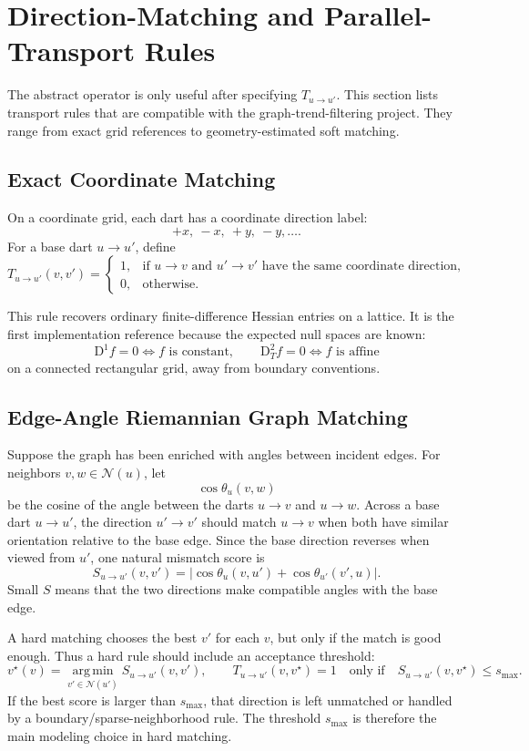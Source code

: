 \documentclass[11pt]{article}
\newcommand{\N}{\mathcal N}
\newcommand{\D}{\mathrm D}
\newcommand{\argmin}{\operatorname*{arg\,min}}
\begin{document}
\section{Direction-Matching and Parallel-Transport Rules}

The abstract operator is only useful after specifying \(T_{u\to u'}\).  This
section lists transport rules that are compatible with the graph-trend-filtering
project.  They range from exact grid references to geometry-estimated soft
matching.

\subsection{Exact Coordinate Matching}

On a coordinate grid, each dart has a coordinate direction label:
\[
  +x,\ -x,\ +y,\ -y,\ldots.
\]
For a base dart \(u\to u'\), define
\[
  T_{u\to u'}(v,v')=
  \begin{cases}
    1, & \text{if } u\to v \text{ and } u'\to v'
         \text{ have the same coordinate direction},\\
    0, & \text{otherwise}.
  \end{cases}
\]

This rule recovers ordinary finite-difference Hessian entries on a lattice.
It is the first implementation reference because the expected null spaces are
known:
\[
  \D^1 f=0 \Longleftrightarrow f \text{ is constant},
  \qquad
  \D_T^2 f=0 \Longleftrightarrow f \text{ is affine}
\]
on a connected rectangular grid, away from boundary conventions.

\subsection{Edge-Angle Riemannian Graph Matching}

Suppose the graph has been enriched with angles between incident edges.  For
neighbors \(v,w\in\N(u)\), let
\[
  \cos\theta_u(v,w)
\]
be the cosine of the angle between the darts \(u\to v\) and \(u\to w\).
Across a base dart \(u\to u'\), the direction \(u'\to v'\) should match
\(u\to v\) when both have similar orientation relative to the base edge.  Since
the base direction reverses when viewed from \(u'\), one natural mismatch score
is
\[
  S_{u\to u'}(v,v')
  =
  \left|
  \cos\theta_u(v,u')
  +
  \cos\theta_{u'}(v',u)
  \right|.
\]
Small \(S\) means that the two directions make compatible angles with the
base edge.

A hard matching chooses the best \(v'\) for each \(v\), but only if the match
is good enough.  Thus a hard rule should include an acceptance threshold:
\[
  v^\star(v)
  =
  \argmin_{v'\in\N(u')} S_{u\to u'}(v,v'),
  \qquad
  T_{u\to u'}(v,v^\star)=1
  \quad\text{only if}\quad
  S_{u\to u'}(v,v^\star)\le s_{\max}.
\]
If the best score is larger than \(s_{\max}\), that direction is left
unmatched or handled by a boundary/sparse-neighborhood rule.  The threshold
\(s_{\max}\) is therefore the main modeling choice in hard matching.
\end{document}
